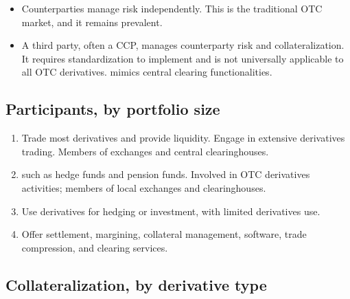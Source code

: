 \begin{itemize}
\item {} Counterparties manage risk independently. This is
the traditional OTC market, and it remains prevalent.
\item {} A third party, often a CCP, manages counterparty
risk and collateralization. It requires standardization to implement and is not
universally applicable to all OTC derivatives. 
mimics central clearing functionalities.
\end{itemize}


\subsection*{Participants, by portfolio size}

\begin{enumerate}
\item {} Trade most derivatives and
provide liquidity. Engage in extensive derivatives trading. Members of exchanges
and central clearinghouses.
\item {}
such as hedge funds and pension funds. Involved in OTC derivatives activities;
members of local exchanges and clearinghouses.
\item {} Use derivatives for hedging or investment, with limited
derivatives use.
\item {} Offer settlement, margining,
collateral management, software, trade compression, and clearing services.
\end{enumerate}

\subsection*{Collateralization, by derivative type}

